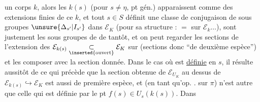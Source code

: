 un corps $k$, alors les $k(s)$ (pour $s\ne\eta$, pt gén.) apparaissent comme des extensions finies de ce $k$, et tout $s\in S$ définit une classe de conjugaison de sous groupes $\unsure{\Delta_{s'}|I_{s'}}$ dans $\mathcal E_K$ (pour sa structure :  $=$   sur $\mathcal E_k\ldots$),   sont justement les sous groupes  de   de tantôt, et on peut regarder les sections de l'extension  des $\mathcal E_{k(s)}\underset{\inserted{\text{ouvert}}}{\subset}\mathcal E_K$ sur (sections donc ``de deuxième espèce'') et les composer avec la section donnée. Dans le cas où   est \uline{définie} en $s$, il résulte aussitôt de ce qui précède que la section  obtenue de $\mathcal E_{U_K}$ au dessus de $\mathcal E_{k(s)}\hookrightarrow\mathcal E_K$ est aussi de première espèce, et  (en tant qu'op. .  sur $\pi$)  n'est autre que celle qui est définie par le pt $f(s)\in U_s(k(s))$. Dans
